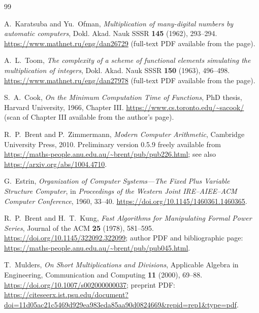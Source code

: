 \documentclass[11pt]{book}
\theoremstyle{definition}
\begin{document}
\begin{thebibliography}{99}

A.~Karatsuba and Yu.~Ofman,
\emph{Multiplication of many-digital numbers by automatic computers},
Dokl. Akad. Nauk SSSR \textbf{145} (1962), 293--294.
\newline
\url{https://www.mathnet.ru/eng/dan26729}
(full-text PDF available from the page).

A.~L.~Toom,
\emph{The complexity of a scheme of functional elements simulating the
multiplication of integers},
Dokl. Akad. Nauk SSSR \textbf{150} (1963), 496--498.
\newline
\url{https://www.mathnet.ru/eng/dan27978}
(full-text PDF available from the page).

S.~A.~Cook,
\emph{On the Minimum Computation Time of Functions},
PhD thesis, Harvard University, 1966, Chapter III.
\newline
\url{https://www.cs.toronto.edu/~sacook/}
(scan of Chapter III available from the author's page).

R.~P.~Brent and P.~Zimmermann,
\emph{Modern Computer Arithmetic},
Cambridge University Press, 2010.
Preliminary version 0.5.9 freely available from
\newline
\url{https://maths-people.anu.edu.au/~brent/pub/pub226.html};
see also \url{https://arxiv.org/abs/1004.4710}.

G.~Estrin,
\emph{Organization of Computer Systems---The Fixed Plus Variable Structure
Computer},
in \emph{Proceedings of the Western Joint IRE--AIEE--ACM Computer Conference},
1960, 33--40.
\newline
\url{https://doi.org/10.1145/1460361.1460365}.

R.~P.~Brent and H.~T.~Kung,
\emph{Fast Algorithms for Manipulating Formal Power Series},
Journal of the ACM \textbf{25} (1978), 581--595.
\newline
\url{https://doi.org/10.1145/322092.322099};
author PDF and bibliographic page:
\url{https://maths-people.anu.edu.au/~brent/pub/pub045.html}.

T.~Mulders,
\emph{On Short Multiplications and Divisions},
Applicable Algebra in Engineering, Communication and Computing \textbf{11}
(2000), 69--88.
\newline
\url{https://doi.org/10.1007/s002000000037};
preprint PDF:
\url{https://citeseerx.ist.psu.edu/document?doi=11d05ac21c5469d929ea983eda85aa90d0824669&repid=rep1&type=pdf}.


\end{thebibliography}
\end{document}
